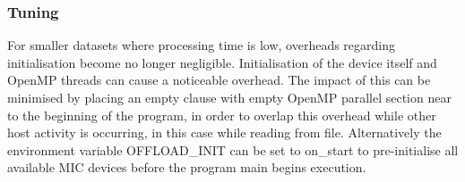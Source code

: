 \documentclass[runningheads,a4paper]{llncs}
\begin{document}



\subsubsection{Tuning}
\label{sect:tuning}

For smaller datasets where processing time is low, overheads regarding initialisation become no longer negligible. 
Initialisation of the device itself and OpenMP threads can cause a noticeable overhead. The impact of this can be 
minimised by placing an empty clause with empty OpenMP parallel section near to the beginning of the program, in order 
to overlap this overhead while other host activity is occurring, in this case while reading from file. Alternatively the 
environment variable OFFLOAD\_INIT can be set to on\_start to pre-initialise all available MIC devices before the program 
main begins execution. 
\end{document}
